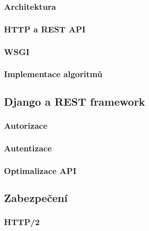 \documentclass[a4paper,11pt,titlepage,fleqn]{article}
\begin{document}
        \subsubsection{Architektura}

        \subsubsection{HTTP a REST API}

        \subsubsection{WSGI}

        \subsubsection{Implementace algoritmů}

    \subsection{Django a REST framework}
        
        \subsubsection{Autorizace}

        \subsubsection{Autentizace}

        \subsubsection{Optimalizace API}

    \subsection{Zabezpečení}

        \subsubsection{HTTP/2}
\end{document}
